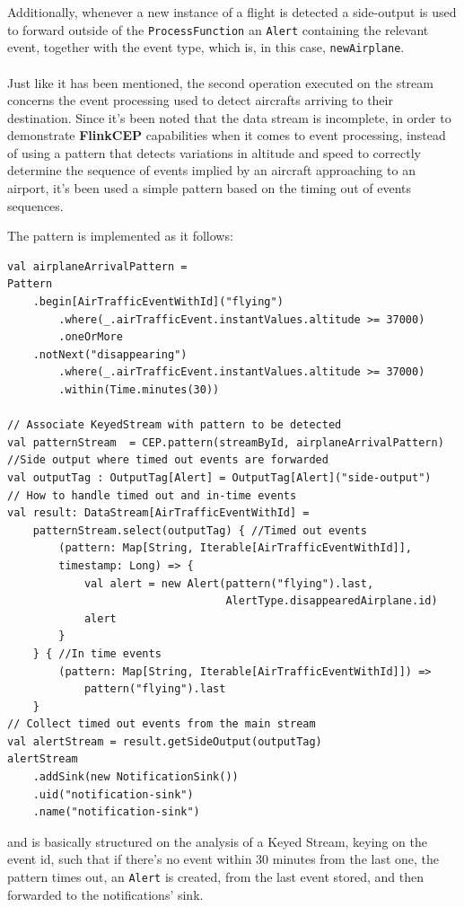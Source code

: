 Additionally, whenever a new instance of a flight is detected a side-output is used to forward outside of the \texttt{ProcessFunction} an \texttt{Alert} containing the relevant event, together with the event type, which is, in this case, \texttt{newAirplane}.
\\\\
Just like it has been mentioned, the second operation executed on the stream concerns the event processing used to detect aircrafts arriving to their destination. Since it's been noted that the data stream is incomplete, in order to demonstrate \textbf{FlinkCEP} capabilities when it comes to event processing, instead of using a pattern that detects variations in altitude and speed to correctly determine the sequence of events implied by an aircraft approaching to an airport, it's been used a simple pattern based on the timing out of events sequences.

The pattern is implemented as it follows:

\begin{verbatim}
val airplaneArrivalPattern = 
Pattern
    .begin[AirTrafficEventWithId]("flying")
        .where(_.airTrafficEvent.instantValues.altitude >= 37000)
        .oneOrMore
    .notNext("disappearing")
        .where(_.airTrafficEvent.instantValues.altitude >= 37000)
        .within(Time.minutes(30))

// Associate KeyedStream with pattern to be detected
val patternStream  = CEP.pattern(streamById, airplaneArrivalPattern)
//Side output where timed out events are forwarded
val outputTag : OutputTag[Alert] = OutputTag[Alert]("side-output")
// How to handle timed out and in-time events
val result: DataStream[AirTrafficEventWithId] = 
    patternStream.select(outputTag) { //Timed out events
        (pattern: Map[String, Iterable[AirTrafficEventWithId]], 
        timestamp: Long) => {
            val alert = new Alert(pattern("flying").last, 
                                  AlertType.disappearedAirplane.id)
            alert
        }
    } { //In time events
        (pattern: Map[String, Iterable[AirTrafficEventWithId]]) =>
            pattern("flying").last
    }   
// Collect timed out events from the main stream
val alertStream = result.getSideOutput(outputTag)
alertStream
    .addSink(new NotificationSink())
    .uid("notification-sink")
    .name("notification-sink")
\end{verbatim}

and is basically structured on the analysis of a Keyed Stream, keying on the event id, such that if there's no event within 30 minutes from the last one, the pattern times out, an \texttt{Alert} is created, from the last event stored, and then forwarded to the notifications' sink.

